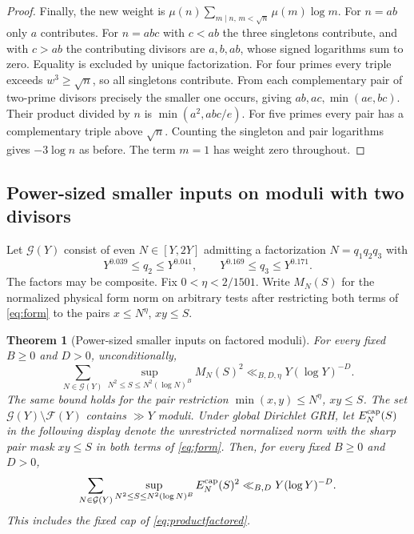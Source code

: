 \documentclass[11pt,a4paper]{article}
\numberwithin{equation}{section}
\newtheorem{theorem}{Theorem}[section]
\begin{document}
\begin{proof}
Finally, the new weight is
$\mu(n)\sum_{m\mid n,\,m<\sqrt n}\mu(m)\log m$.
For $n=ab$ only $a$ contributes. For $n=abc$ with $c<ab$ the
three singletons contribute, and with $c>ab$ the contributing
divisors are $a,b,ab$, whose signed logarithms sum to zero.
Equality is excluded by unique factorization.
For four primes every triple exceeds $w^3\ge\sqrt n$, so all
singletons contribute. From each complementary pair of
two-prime divisors precisely the smaller one occurs, giving
$ab,ac,\min(ae,bc)$. Their product divided by $n$ is
$\min(a^2,abc/e)$. For five primes every pair has a complementary
triple above $\sqrt n$. Counting the singleton and pair
logarithms gives $-3\log n$ as before. The term $m=1$ has weight
zero throughout.
\end{proof}

\clearpage
\subsection{Power-sized smaller inputs on moduli with two divisors}

Let $\mathcal G(Y)$ consist of even $N\in[Y,2Y]$ admitting a
factorization $N=q_1q_2q_3$ with
\[
 Y^{0.039}\le q_2\le Y^{0.041},\qquad
 Y^{0.169}\le q_3\le Y^{0.171}.
\]
The factors may be composite. Fix $0<\eta<2/1501$.
Write $M_N(S)$ for the normalized physical form norm on arbitrary
tests after restricting both terms of \cref{eq:form} to the pairs
$x\le N^\eta$, $xy\le S$.

\begin{theorem}[Power-sized smaller inputs on factored moduli]
\label{thm:power-small-factors}
For every fixed $B\ge0$ and $D>0$, unconditionally,
\begin{equation}
 \sum_{N\in\mathcal G(Y)}
  \sup_{N^2\le S\le N^2(\log N)^B} M_N(S)^2
 \ll_{B,D,\eta}Y(\log Y)^{-D}.
 \label{eq:power-small-factors}
\end{equation}
The same bound holds for the pair restriction
$\min(x,y)\le N^\eta$, $xy\le S$. The set
$\mathcal G(Y)\setminus\mathcal F(Y)$ contains $\gg Y$
moduli. Under global Dirichlet GRH, let $E_N^{\rm cap}(S)$ in the
following display denote the unrestricted normalized norm with
the sharp pair mask $xy\le S$ in both terms of \cref{eq:form}.
Then, for every fixed $B\ge0$ and $D>0$,
\[
 \sum_{N\in\mathcal G(Y)}\sup_{N^2\le S\le N^2(\log N)^B}
 E_N^{\rm cap}(S)^2\ll_{B,D}Y(\log Y)^{-D}.
\]
This includes the fixed cap of \cref{eq:productfactored}.
\end{theorem}
\end{document}
